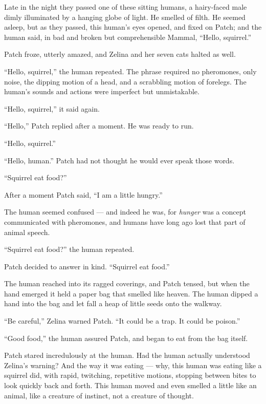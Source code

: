 \documentclass[ebook,oneside,openany,17pt]{memoir}
\newenvironment{tolerant}[1]{%
  \par\tolerance=#1\relax
}{%
  \par
}
\begin{document}
Late in the night they passed one of these sitting humans, a
hairy-faced male dimly illuminated by a hanging globe of light. He
smelled of filth. He seemed asleep, but as they passed, this human’s
eyes opened, and fixed on Patch; and the human said, in bad and broken
but comprehensible Mammal, “Hello, squirrel.”

Patch froze, utterly amazed, and Zelina and her seven cats halted as
well.

\begin{tolerant}{2000}
“Hello, squirrel,” the human repeated. The phrase required no
pheromones, only noise, the dipping motion of a head, and a scrabbling
motion of forelegs. The human’s sounds and actions were imperfect but
unmistakable.
\end{tolerant}

“Hello, squirrel,” it said again.

“Hello,” Patch replied after a moment. He was ready to run.

“Hello, squirrel.”

“Hello, human.” Patch had not thought he would ever speak those words.

“Squirrel eat food?”

After a moment Patch said, “I am a little hungry.”

The human seemed confused — and indeed he was, for \emph{hunger} was
a concept communicated with pheromones, and humans have long ago lost
that part of animal speech.

“Squirrel eat food?” the human repeated.

Patch decided to answer in kind. “Squirrel eat food.”

\begin{tolerant}{500}
The human reached into its ragged coverings, and Patch tensed, but
when the hand emerged it held a paper bag that smelled like
heaven. The human dipped a hand into the bag and let fall a heap of
little seeds onto the walkway.
\end{tolerant}

“Be careful,” Zelina warned Patch. “It could be a trap. It could be
poison.”

“Good food,” the human assured Patch, and began to eat from the bag
itself.

\begin{tolerant}{1000}
Patch stared incredulously at the human. Had the human actually
understood Zelina’s warning? And the way it was eating — why, this
human was eating like a squirrel did, with rapid, twitching,
repetitive motions, stopping between bites to look quickly back and
forth. This human moved and even smelled a little like an animal, like
a creature of instinct, not a creature of thought.
\end{tolerant}
\end{document}
